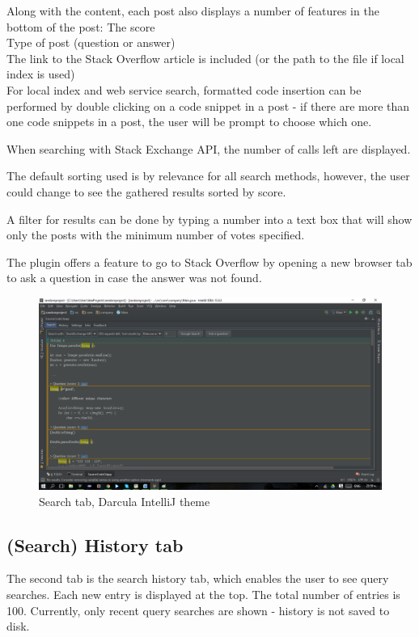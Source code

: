 \documentclass{l4proj}
\begin{document}
Along with the content, each post also displays a number of features in the bottom of the post:
The score\\
Type of post (question or answer)\\
The link to the Stack Overflow article is included (or the path to the file if local index is used)\\

For local index and web service search, formatted code insertion can be performed by double clicking on a code snippet in a post - if there are more than one code snippets in a post, the user will be prompt to choose which one.

When searching with Stack Exchange API, the number of calls left are displayed.

The default sorting used is by relevance for all search methods, however, the user could change to see the gathered results sorted by score.

A filter for results can be done by typing a number into a text box that will show only the posts with the minimum number of votes specified.

The plugin offers a feature to go to Stack Overflow by opening a new browser tab to ask a question in case the answer was not found.

\begin{figure}[H]
\includegraphics[scale=0.4]{tab-search}
\centering
\caption{Search tab, Darcula IntelliJ theme}
\label{fig:search-tab}
\end{figure}

\subsection{(Search) History tab}
The second tab is the search history tab, which enables the user to see query searches. Each new entry is displayed at the top. The total number of entries is 100. Currently, only recent query searches are shown - history is not saved to disk.
\end{document}
